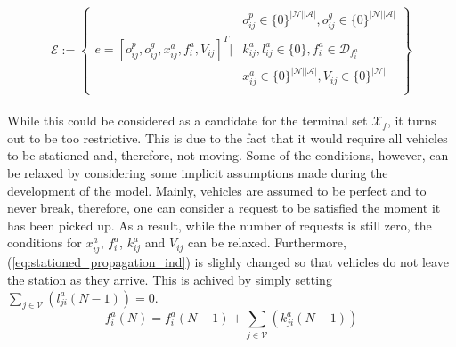 \begin{equation}
	\mathcal{E} := \left\{
	\begin{aligned}
		& o^p_{ij} \in \{0\}^{|\mathcal{N}||\mathcal{A}|} , o^g_{ij} \in \{0\}^{|\mathcal{N}||\mathcal{A}|}  \\
		e = [o^p_{ij},o^g_{ij}, x_{ij}^a, f^a_{i}, V_{ij}]^T \Bigg| &k^a_{ij}, l^a_{ij}\in \{0\}, f^a_{i} \in \mathcal{D}_{f^a_{i}}   \\
		&  x_{ij}^a\in\{0\}^{|\mathcal{N}||\mathcal{A}|}, V_{ij} \in \{0\}^{|\mathcal{N}|} \\%
	\end{aligned}
	\right\}\label{eq:final_eq}
\end{equation}\\
While this could be considered as a candidate for the terminal set $\mathcal{X}_f$, it turns out to be too restrictive. This is due to the fact that it would require all vehicles to be stationed and, therefore, not moving. Some of the conditions, however, can be relaxed by considering some implicit assumptions made during the development of the model. Mainly, vehicles are assumed to be perfect and to never break, therefore, one can consider a request to be satisfied the moment it has been picked up. As a result, while the number of requests is still zero, the conditions for $x_{ij}^a$, $f_{i}^a$, $k^a_{ij}$ and $V_{ij}$ can be relaxed. Furthermore, (\ref{eq:stationed_propagation_ind}) is slighly changed so that vehicles do not leave the station as they arrive. This is achived by simply setting  $\sum_{j\in\mathcal{V}}(l^a_{ji}(N-1))=0$.
\begin{equation}
	f^a_i(N) =f^a_i(N-1) + \sum_{j\in\mathcal{V}}(k^a_{ji}(N-1)) 
	\label{eq:stationed_propagation_ind2}
\end{equation}




